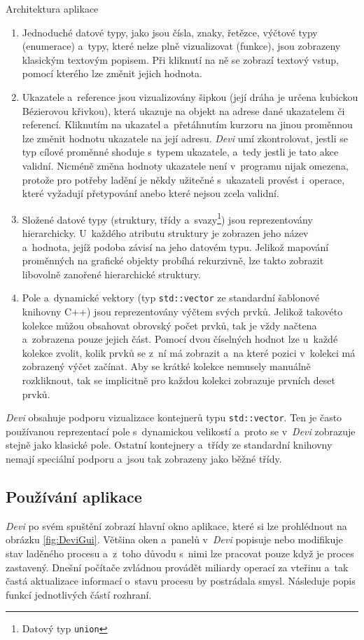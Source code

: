 \documentclass[czech,bachelor,male,python,dept460,hidelinks]{diploma}						%
\newcommand{\parspace}[1][]{
	\ifthenelse{\isempty{#1}}{\vspace{0mm}}{\vspace{#1}}
	\par
}
\begin{document}
\begin{section}{Architektura aplikace}
	\begin{enumerate}
		\item Jednoduché datové typy, jako jsou čísla, znaky, řetězce, výčtové typy (enumerace) a~typy, které nelze plně vizualizovat
			(funkce), jsou zobrazeny klasickým textovým popisem. Při kliknutí na ně se zobrazí textový vstup, pomocí kterého lze změnit jejich hodnota.
		\item Ukazatele a~reference jsou vizualizovány šipkou (její dráha je určena kubickou Bézierovou křivkou), která ukazuje na objekt na adrese
			dané ukazatelem či referencí. Kliknutím na ukazatel a~přetáhnutím kurzoru na jinou proměnnou lze změnit hodnotu ukazatele na její adresu.
			\textit{Devi} umí zkontrolovat, jestli se typ cílové proměnné shoduje s~typem ukazatele, a~tedy jestli je tato akce validní. Nicméně změna hodnoty
			ukazatele není v~programu nijak omezena, protože pro potřeby ladění je někdy užitečné s~ukazateli provést i~operace, které vyžadují přetypování anebo
			které nejsou zcela validní.
		\item Složené datové typy (struktury, třídy a~svazy\footnote{Datový typ \texttt{union}}) jsou reprezentovány hierarchicky. U~každého atributu
			struktury je zobrazen jeho název a~hodnota, jejíž podoba závisí na jeho datovém typu. Jelikož mapování proměnných na grafické objekty probíhá
			rekurzivně, lze takto zobrazit libovolně zanořené hierarchické struktury.
		\item Pole a~dynamické vektory (typ \texttt{std::vector} ze standardní šablonové knihovny C++) jsou reprezentovány výčtem svých prvků.
			Jelikož takovéto kolekce můžou obsahovat obrovský počet prvků, tak je vždy načtena a~zobrazena pouze jejich část. Pomocí dvou číselných hodnot lze u~každé
			kolekce zvolit, kolik prvků se z~ní má zobrazit a~na které pozici v~kolekci má zobrazený výčet začínat. Aby se krátké kolekce nemusely manuálně rozkliknout,
			tak se implicitně pro každou kolekci zobrazuje prvních deset prvků.
	\end{enumerate}
	
	\parspace \textit{Devi} obsahuje podporu vizualizace kontejnerů typu \texttt{std::vector}. Ten je často používanou
	reprezentací pole s~dynamickou velikostí a~proto se v~\textit{Devi} zobrazuje stejně jako klasické pole. Ostatní kontejnery a~třídy ze standardní knihovny
	nemají speciální podporu a~jsou tak zobrazeny jako běžné třídy.
	
	\subsection{Používání aplikace}
	\textit{Devi} po svém spuštění zobrazí hlavní okno aplikace, které si lze prohlédnout na obrázku \ref{fig:DeviGui}.
	Většina oken a~panelů v~\textit{Devi} popisuje nebo modifikuje stav laděného procesu a~z~toho důvodu s~nimi lze pracovat pouze když je proces
	zastavený. Dnešní počítače zvládnou provádět miliardy operací za vteřinu a~tak častá aktualizace informací o~stavu procesu by postrádala smysl.
	Následuje popis funkcí jednotlivých částí rozhraní.
	

\end{section}
\end{document}
